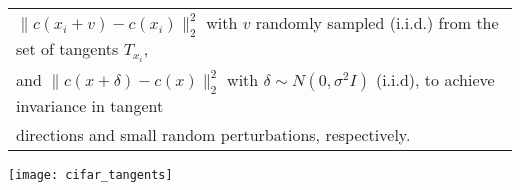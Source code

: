 \documentclass{article}
\begin{document}
{\begin{table}[h]
\begin{tabular}{|l|}
		\quad \quad  $\lVert c(x_i+v) - c(x_i)\rVert_2^2$ with $v$ randomly sampled (i.i.d.) from the set of tangents $T_{x_i}$,\\ 
		\quad \quad and $\lVert c(x+\delta) - c(x)\rVert_2^2$ with $\delta\sim N(0,\sigma^2 I)$ (i.i.d), to achieve invariance in tangent \\ \quad \quad directions and small random perturbations, respectively.\\
		\hline
	\end{tabular}
	\label{Table:algorithm}
\end{table}
}%
	\centering
    \texttt{[image: cifar\_tangents]}
    \caption{CIFAR10 tangents. \emph{Odd rows:} Tangents using our method for estimating the dominant tangent space. \emph{Even rows:} Tangents using SVD on $J_{h(x)} g$ and $J_x h$. \emph{First column:} Original image. \emph{Second column:} Reconstructed image using $g \circ h$. \emph{Third column:} Reconstructed image using $g\circ \bar{p} \circ p \circ h$. \emph{Columns 4-13:} Tangents using encoder. \emph{Columns 14-23:} Tangents using generator.}
\end{document}
